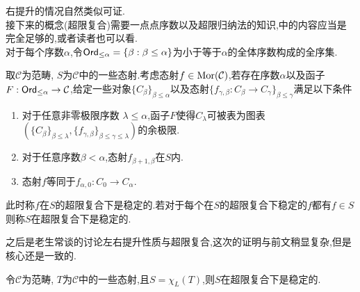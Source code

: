 右提升的情况自然类似可证.\\
接下来的概念(超限复合)需要一点点序数以及超限归纳法的知识,\cite[$\S$1.2-1.3]{李文威卷一}中的内容应当是完全足够的,或者读者也可以看\cite[\href{https://kerodon.net/tag/03PV}{03PV}]{Kerodon}.\\
对于每个序数$\alpha$,令$\mathsf{Ord}_{\leq \alpha} = \{\beta : \beta \leq \alpha\}$为小于等于$\alpha$的全体序数构成的全序集.
\begin{definition}[超限复合下稳定]
    取$\mathcal{C}$为范畴, $S$为$\mathcal{C}$中的一些态射.考虑态射$f\in \operatorname{Mor}(\mathcal{C})$,若存在序数$\alpha$以及函子$F: \mathsf{Ord}_{\leq \alpha} \to \mathcal{C}$,给定一些对象$\{C_{\beta}\}_{\beta \leq \alpha}$以及态射$\{f_{\gamma,\beta}:C_{\beta}\to C_{\gamma}\}_{\beta \leq \gamma}$满足以下条件
    \begin{enumerate}
        \item 对于任意非零极限序数 $\lambda \leq \alpha$,函子$F$使得$C_{\lambda}$可被表为图表$\left(\{C_{\beta}\}_{\beta \leq \lambda}, \{f_{\gamma,\beta}\}_{\beta \leq \gamma \leq \lambda}\right)$的余极限.
        \item 对于任意序数$\beta < \alpha$,态射$f_{\beta+1,\beta}$在$S$内.
        \item 态射$f$等同于$f_{\alpha,0} : C_0 \to C_{\alpha}$.
    \end{enumerate}
    此时称$f$在$S$的超限复合下是稳定的.若对于每个在$S$的超限复合下稳定的$f$都有$f\in S$则称$S$在超限复合下是稳定的.
\end{definition}
之后是老生常谈的讨论左右提升性质与超限复合,这次的证明与前文稍显复杂,但是核心还是一致的.
\begin{proposition}
    令$\mathcal{C}$为范畴, $T$为$\mathcal{C}$中的一些态射,且$S = \chi_L(T)$,则$S$在超限复合下是稳定的.
\end{proposition}
